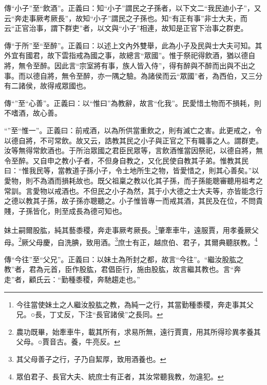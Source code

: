 {\noindent\zhuan{}\fzbyks 傳“小子”至“飲酒”。正義曰：知“小子”謂民之子孫者，以下文二“我民迪小子”，又云“奔走事厥考厥長”，故知“小子”謂民之子孫也。知“有正有事”非士大夫，而云“正官治事，謂下群吏”者，以文與“小子”相連，故知是正官下治事之群吏。 \par}

{\noindent\zhuan{}\fzbyks 傳“于所”至“至醉”。正義曰：以述上文內外雙舉，此為小子及民與士大夫可知。其外宜有國君，故下雲指戒為國之事，故總言“眾國”。惟于祭祀得飲酒，猶以德自將，無令至醉。因此言“宗室將有事，族人皆入侍”，得有醉與不醉而出與不出之事。而以德自將，無令至醉，亦一隅之驗。為諸侯而云“眾國”者，為西伯，又三分有二諸侯，故得戒眾國也。 \par}

{\noindent\zhuan{}\fzbyks 傳“”至“心善”。正義曰：以“惟曰”為教辭，故言“化我”。民愛惜土物而不損耗，則不嗜酒，故心善。 \par}

{\noindent\shu{}\fzkt “”至“惟一”。正義曰：前戒酒，以為所供當重飲之，則有滅亡之害。此更戒之，令以德自將，不可常飲。故又云，誥教其民之小子與正官之下有職事之人。謂群吏。汝等無得常飲酒也。于所治眾國之君臣民眾等，言飲酒惟當因祭祀，以德自將，無令至醉。又自申之教小子者，不但身自教之，又化民使自教其子弟。惟教其民曰：“惟我民等，當教道子孫小子，令土地所生之物，皆愛惜之，則其心善矣。”以愛物，則不為酒而損耗故也。既父祖稟之教以化其子孫，而子孫能聰審聽用祖考之常訓。言愛物以戒酒也。不但民之小子為然，其于小大德之士大夫等，亦皆能念行之德以教其子孫，故子孫亦聰聽之。小子惟皆專一而戒其酒，其民及在位，不問貴賤，子孫皆化，則至成長為德可知也。 \par}

妹土嗣爾股肱，純其藝黍稷，奔走事厥考厥長。\footnote{今往當使妹土之人繼汝股肱之教，為純一之行，其當勤種黍稷，奔走事其父兄。○長，丁丈反，下注“長官諸侯”之長同。}肇牽車牛，遠服賈，用孝養厥父母。\footnote{農功既畢，始牽車牛，載其所有，求易所無，遠行賈賣，用其所得珍異孝養其父母。○賈音古。養，牛亮反。}厥父母慶，自洗腆，致用酒。\footnote{其父母善子之行，子乃自絜厚，致用酒養也。}庶士有正，越庶伯、君子，其爾典聽朕教。\footnote{眾伯君子、長官大夫、統庶士有正者，其汝常聽我教，勿違犯。}


{\noindent\zhuan{}\fzbyks 傳“今往”至“父兄”。正義曰：以妹土為所封之都，故言“今往”。“繼汝股肱之教”者，君為元首，臣作股肱，君倡臣行，施由股肱，故言繼其教也。言“奔走”者，顧氏云：“勤種黍稷，奔馳趨走也。” \par}

